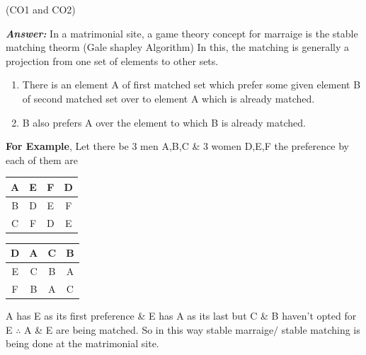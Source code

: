 \documentclass[15pt]{article}
\begin{document}
\begin{enumerate}
\begin{enumerate}
\begin{flushright}
[3] (CO1 and CO2)
\end{flushright}
\textbf{\emph{Answer: }} In a matrimonial site, a game theory concept for marraige is the stable matching theorm (Gale shapley Algorithm)
In this, the matching is generally a projection from one set of elements to other sets.
\begin{enumerate}
\item There is an element A of first matched set which prefer some given element B of second matched set over to element A which is already matched.
\item B also prefers A over the element to which B is already matched.
\end{enumerate}
\textbf{For Example}, Let there be 3 men A,B,C \& 3 women D,E,F the preference by each of them are\\
\begin{center}
\begin{tabular}{ |c|c c c| } 
 \hline
 A & E & F & D \\ [0.5ex] 
 \hline
 B & D & E & F \\ 
 \hline
 C & F & D & E \\ [1ex] 
 \hline
\end{tabular}
\begin{tabular}{ |c|c c c| } 
 \hline
 D & A & C & B \\ [0.5ex] 
 \hline
 E & C & B & A \\ 
 \hline
 F & B & A & C \\ [1ex] 
 \hline
\end{tabular}
\end{center}
A has E as its first preference \& E has A as its last but C \& B haven't opted for E $\therefore$ A \& E are being matched. So in this way stable marraige$/$ stable matching is being done at the matrimonial site.
\end{enumerate}
\end{enumerate}
\end{document}
